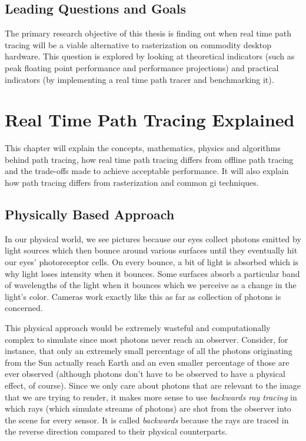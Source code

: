 \documentclass[
  twoside,
  11pt, a4paper,
  footinclude=true,
  headinclude=true,
  cleardoublepage=empty
]{scrreprt}
\begin{document}
\section{Leading Questions and Goals}
The primary research objective of this thesis is finding out when real time path tracing will be a
viable alternative to rasterization on commodity desktop hardware. This question is explored by looking at
theoretical indicators (such as peak floating point performance and performance projections)
and practical indicators (by implementing a real time path tracer and benchmarking it).

\chapter{Real Time Path Tracing Explained}
This chapter will explain the concepts, mathematics, physics and algorithms behind path tracing,
how real time path tracing differs from offline path tracing and the trade-offs made to achieve
acceptable performance. It will also explain how path tracing differs from rasterization and common
\ac{gi} techniques.

\section{Physically Based Approach}
In our physical world, we see pictures because our eyes collect photons emitted by light
sources which then bounce around various surfaces until they eventually hit our eyes'
photoreceptor cells. On every bounce, a bit of light is absorbed which is why light loses intensity
when it bounces. Some surfaces absorb a particular band of wavelengths of the light when it bounces
which we perceive as a change in the light's color. Cameras work exactly like this as far as
collection of photons is concerned.

This physical approach would be extremely wasteful and
computationally complex to simulate since most photons never reach an observer. Consider,
for instance, that only an extremely small percentage of all the photons originating from the Sun actually
reach Earth and an even smaller percentage of those are ever observed (although photons
don't have to be observed to have a physical effect, of course). Since we only care about photons that
are relevant to the image that we are trying to render, it makes more sense to use
\emph{backwards ray tracing} in which rays (which simulate streams of photons) are shot from the
observer into the scene for every sensor. It is called \textit{backwards} because the rays are
traced in the reverse direction compared to their physical counterparts.
\end{document}
